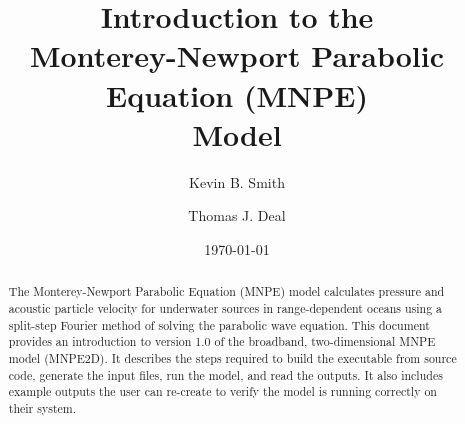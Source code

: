 \documentclass[11pt]{article}
\begin{document}
\title{Introduction to the\\Monterey-Newport Parabolic Equation (MNPE)\\Model}
\author[1]{Kevin B. Smith}
\author[2]{Thomas J. Deal}
\date{\today}
\maketitle

\begin{abstract}
The Monterey-Newport Parabolic Equation (MNPE) model calculates pressure and acoustic particle velocity for underwater sources in range-dependent oceans using a split-step Fourier method of solving the parabolic wave equation. This document provides an introduction to version 1.0 of the broadband, two-dimensional MNPE model (MNPE2D). It describes the steps required to build the executable from source code, generate the input files, run the model, and read the outputs. It also includes example outputs the user can re-create to verify the model is running correctly on their system.
\end{abstract}

\newpage
\tableofcontents
\newpage
\listoftables
\listoffigures






\appendix 
\renewcommand\thefigure{\thesection.\arabic{figure}}  
\renewcommand\theequation{\thesection.\arabic{equation}}  




\newpage


\end{document}
